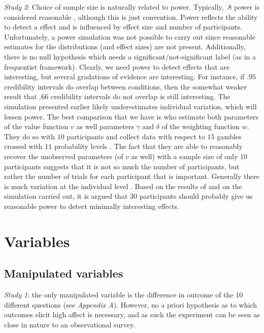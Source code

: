 \documentclass[12pt]{article}
\begin{document}
\emph{Study 2}: Choice of sample
size is naturally related to
power. Typically, $.8$ power is considered reasonable
\autocite{cohen1992power},
although this is just convention. Power reflects the
ability to detect a effect and is influenced by
effect size and number of participants.
Unfortunately, a power simulation was not possible
to carry out since reasonable estimates for the
distributions (and effect sizes) are not present.
Additionally, there is no null hypothesis which
needs a significant/not-significant label (as
in a frequentist framework). Clearly, we need
power to detect effects that are interesting,
but several gradations of evidence are interesting.
For instance, if $.95$ credibility intervals do overlap
between conditions,
then the somewhat weaker result that  $.66$
credibility intervals do not overlap is still
interesting.
The simulation presented earlier likely underestimates
individual variation, which will lessen power.
The best comparison that we have is
\textcite{gonzalez1999shape} who estimate both
parameters of the value function $v$ as well
parameters $\gamma$ and  $\delta$ of the weighting
function  $w$. They do so with  $10$ participants and
collect data with respect to $15$ gambles crossed
with  $11$ probability levels \autocite{gonzalez1999shape}.
The fact that they are able to reasonably recover
the unobserved parameters (of  $v$ as well) with
a sample size of only $10$ participants suggests
that it is not so much the number of participants,
but rather the number of trials for each participant
that is important. Generally there is much
variation at the individual level
\autocite{gonzalez1999shape,
wu1996curvature,
abdellaoui2010separating}.
Based on the results of
\textcite{gonzalez1999shape}
and on the simulation carried
out, it is argued that $30$ participants should
probably give us reasonable power to detect
minimally interesting effects.

\section{Variables}

\subsection{Manipulated variables}

\emph{Study 1}: the only manipulated
variable is the difference in outcome
of the 10 different questions (see \emph{Appendix A}).
However, no a priori hypothesis as to which
outcomes elicit high affect is necessary,
and as such the experiment can be seen as
close in nature to an observational survey. \\
\end{document}
